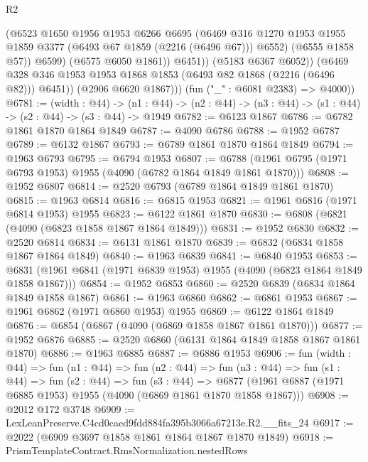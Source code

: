 \begin{lexlean}{R2}
\begin{coremodule}
                      (@6523
                        @1650
                        @1956
                        @1953
                        @6266
                        @6695
                        (@6469
                          @316
                          @1270
                          @1953
                          @1955
                          @1859
                          @3377
                          (@6493 @67 @1859 (@2216 (@6496 @67)))
                          @6552)
                        (@6555 @1858 @57))
                      @6599)
                    (@6575 @6050 @1861))
                  @6451))
              (@5183 @6367 @6052))
            (@6469 @328 @346 @1953 @1953 @1868 @1853 (@6493 @82 @1868 (@2216 (@6496 @82))) @6451))
          (@2906 @6620 @1867)))
      (fun ("_" : @6081 @2383) => @4000))
@6781 := (width : @44) ->
  (n1 : @44) -> (n2 : @44) -> (n3 : @44) -> (s1 : @44) -> (s2 : @44) -> (s3 : @44) -> @1949
@6782 := @6123 @1867
@6786 := @6782 @1861 @1870 @1864 @1849
@6787 := @4090 @6786
@6788 := @1952 @6787
@6789 := @6132 @1867
@6793 := @6789 @1861 @1870 @1864 @1849
@6794 := @1963 @6793
@6795 := @6794 @1953
@6807 := @6788 (@1961 @6795 (@1971 @6793 @1953) @1955 (@4090 (@6782 @1864 @1849 @1861 @1870)))
@6808 := @1952 @6807
@6814 := @2520 @6793 (@6789 @1864 @1849 @1861 @1870)
@6815 := @1963 @6814
@6816 := @6815 @1953
@6821 := @1961 @6816 (@1971 @6814 @1953) @1955
@6823 := @6122 @1861 @1870
@6830 := @6808 (@6821 (@4090 (@6823 @1858 @1867 @1864 @1849)))
@6831 := @1952 @6830
@6832 := @2520 @6814
@6834 := @6131 @1861 @1870
@6839 := @6832 (@6834 @1858 @1867 @1864 @1849)
@6840 := @1963 @6839
@6841 := @6840 @1953
@6853 := @6831 (@1961 @6841 (@1971 @6839 @1953) @1955 (@4090 (@6823 @1864 @1849 @1858 @1867)))
@6854 := @1952 @6853
@6860 := @2520 @6839 (@6834 @1864 @1849 @1858 @1867)
@6861 := @1963 @6860
@6862 := @6861 @1953
@6867 := @1961 @6862 (@1971 @6860 @1953) @1955
@6869 := @6122 @1864 @1849
@6876 := @6854 (@6867 (@4090 (@6869 @1858 @1867 @1861 @1870)))
@6877 := @1952 @6876
@6885 := @2520 @6860 (@6131 @1864 @1849 @1858 @1867 @1861 @1870)
@6886 := @1963 @6885
@6887 := @6886 @1953
@6906 := fun (width : @44) =>
  fun (n1 : @44) =>
  fun (n2 : @44) =>
  fun (n3 : @44) =>
  fun (s1 : @44) =>
  fun (s2 : @44) =>
  fun (s3 : @44) =>
  @6877 (@1961 @6887 (@1971 @6885 @1953) @1955 (@4090 (@6869 @1861 @1870 @1858 @1867)))
@6908 := @2012 @172 @3748
@6909 := LexLeanPreserve.C4cd0caed9fdd884fa395b3066a67213e.R2.__fits_24
@6917 := @2022 (@6909 @3697 @1858 @1861 @1864 @1867 @1870 @1849)
@6918 := PrismTemplateContract.RmsNormalization.nestedRows

\end{coremodule}
\end{lexlean}
